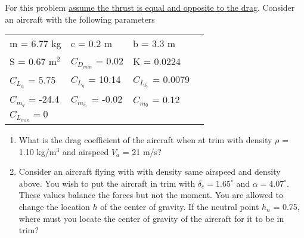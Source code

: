\begin{question}

For this problem \underline{assume the thrust is equal and opposite to the drag}. Consider an aircraft with the following parameters
\begin{table}[!h]
\centering
\label{my-label}
\begin{tabular}{llll}
 m = 6.77 kg & c = 0.2 m   & b = 3.3 m \\
 S = 0.67 m$^2$ & $C_{D_{min}}$ = 0.02  &  K = 0.0224   \\
 $C_{L_{\alpha}}$ = 5.75 & $C_{L_{q}}$ = 10.14  & $C_{L_{\delta_e}}$ = 0.0079  \\
 $C_{m_{q}}$ = -24.4  & $C_{m_{\delta_e}}$ = -0.02  & $C_{m_{0}}$ = 0.12\\
 $C_{L_{min}} = 0$ & & 
\end{tabular}
\end{table}

\begin{enumerate}
\item What is the drag coefficient of the aircraft when at trim with density $\rho$ = 1.10 kg/m$^3$ and airspeed $V_a$ = 21 m/s?

\item Consider an aircraft flying with with density same airspeed and density above. You wish to put the aircraft in trim with $\delta_e = 1.65^{\circ}$ and $\alpha = 4.07^{\circ}$. These values balance the forces but not the moment. You are allowed to change the location $h$ of the center of gravity. If the neutral point $h_n$ = 0.75, where must you locate the center of gravity of the aircraft for it to be in trim?
\end{enumerate}
\end{question}